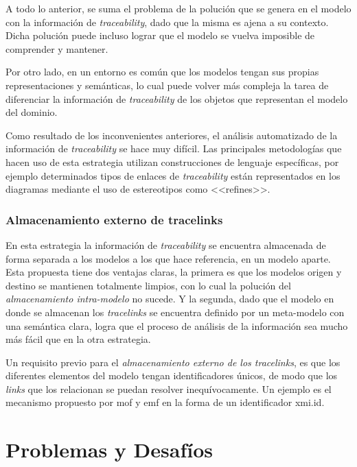 \documentclass[a4paper,12pt,oneside,spanish]{book}
\begin{document}
A todo lo anterior, se suma el problema de la polución que se genera en el modelo con la información de \textit{traceability}, dado que la misma es ajena a su contexto. Dicha polución puede incluso lograr que el modelo se vuelva imposible de comprender y mantener.

Por otro lado, en un entorno  es común que los modelos tengan sus propias representaciones y semánticas, lo cual puede volver más compleja la tarea de diferenciar la información de \textit{traceability} de los objetos que representan el modelo del dominio.

Como resultado de los inconvenientes anteriores, el análisis automatizado de la información de \textit{traceability} se hace muy difícil. Las principales metodologías que hacen uso de esta estrategia utilizan construcciones de lenguaje específicas, por ejemplo determinados tipos de enlaces de \textit{traceability} están representados en los diagramas  mediante el uso de estereotipos como \textsf{<<refines>>}.

\subsection{Almacenamiento externo de tracelinks}

En esta estrategia la información de \textit{traceability} se encuentra almacenada de forma separada a los modelos a los que hace referencia, en un modelo aparte. Esta propuesta tiene dos ventajas claras, la primera es que los modelos origen y destino se mantienen totalmente limpios, con lo cual la polución del \textit{almacenamiento intra-modelo} no sucede. Y la segunda, dado que el modelo en donde se almacenan los \textit{tracelinks} se encuentra definido por un meta-modelo con una semántica clara, logra que el proceso de análisis de la información sea mucho más fácil que en la otra estrategia.

Un requisito previo para el \textit{almacenamiento externo de los tracelinks}, es que los diferentes elementos del modelo tengan identificadores únicos, de modo que los \textit{links} que los relacionan se puedan resolver inequívocamente. Un ejemplo es el mecanismo propuesto por \gls{mof} y \gls{emf} en la forma de un identificador \textsf{xmi.id}.




\chapter{Problemas y Desafíos}
\label{cap:ProblemasDesafios}
\end{document}
